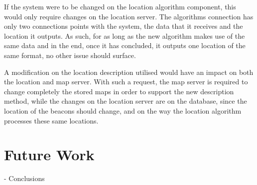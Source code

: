 \documentclass[a4paper]{IEEEtran}
\begin{document}
If the system were to be changed on the location algorithm component, this would only require changes on the location server. The algorithms connection has only two connections points with the system, the data that it receives and the location it outputs. As such, for as long as the new algorithm makes use of the same data and in the end, once it has concluded, it outputs one location of the same format, no other issue should surface.

A modification on the location description utilised would have an impact on both the location and map server. With such a request, the map server is required to change completely the stored maps in order to support the new description method, while the changes on the location server are on the database, since the location of the beacons should change, and on the way the location algorithm processes these same locations.  

\section{Future Work}
\label{sec:future}

- Conclusions





\end{document}
